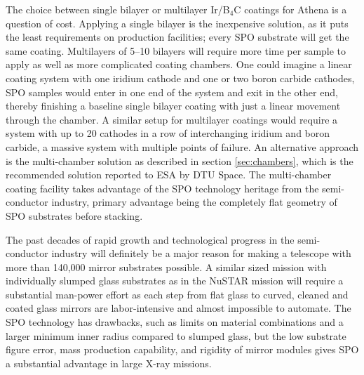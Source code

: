 The choice between single bilayer or multilayer Ir/B$_4$C coatings for Athena is a question of cost. Applying a single bilayer is the inexpensive solution, as it puts the least requirements on production facilities; every SPO substrate will get the same coating. Multilayers of 5--10 bilayers will require more time per sample to apply as well as more complicated coating chambers. One could imagine a linear coating system with one iridium cathode and one or two boron carbide cathodes, SPO samples would enter in one end of the system and exit in the other end, thereby finishing a baseline single bilayer coating with just a linear movement through the chamber. A similar setup for multilayer coatings would require a system with up to 20 cathodes in a row of interchanging iridium and boron carbide, a massive system with multiple points of failure. An alternative approach is the multi-chamber solution as described in section \ref{sec:chambers}, which is the recommended solution reported to ESA by DTU Space. The multi-chamber coating facility takes advantage of the SPO technology heritage from the semi-conductor industry, primary advantage being the completely flat geometry of SPO substrates before stacking.

The past decades of rapid growth and technological progress in the semi-conductor industry will definitely be a major reason for making a telescope with more than 140,000 mirror substrates possible. A similar sized mission with individually slumped glass substrates as in the NuSTAR mission will require a substantial man-power effort as each step from flat glass to curved, cleaned and coated glass mirrors are labor-intensive and almost impossible to automate. The SPO technology has drawbacks, such as limits on material combinations and a larger minimum inner radius compared to slumped glass, but the low substrate figure error, mass production capability, and rigidity of mirror modules gives SPO a substantial advantage in large X-ray missions.
